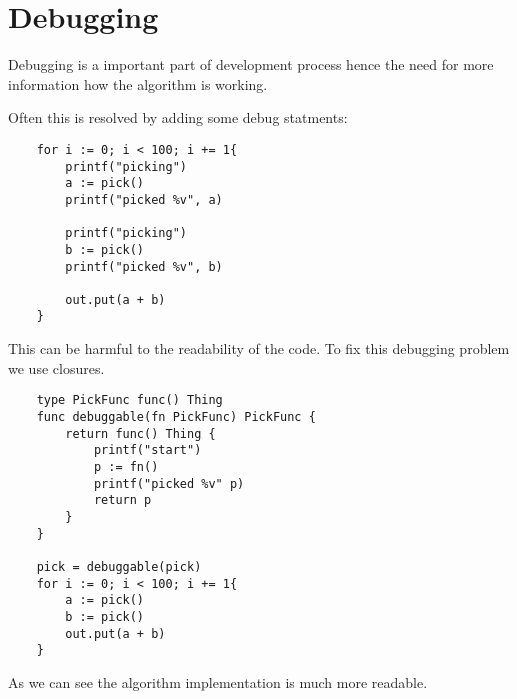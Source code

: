\section{Debugging}

Debugging is a important part of development process hence the need for
more information how the algorithm is working.

Often this is resolved by adding some debug statments:

\begin{verbatim}
	for i := 0; i < 100; i += 1{
		printf("picking")
		a := pick()
		printf("picked %v", a)

		printf("picking")
		b := pick()
		printf("picked %v", b)
		
		out.put(a + b)
	}
\end{verbatim}

This can be harmful to the readability of the code. To fix this debugging 
problem we use closures.

\begin{verbatim}
	type PickFunc func() Thing
	func debuggable(fn PickFunc) PickFunc {
		return func() Thing {
			printf("start")
			p := fn()
			printf("picked %v" p)
			return p
		}
	}

	pick = debuggable(pick)
	for i := 0; i < 100; i += 1{
		a := pick()
		b := pick()
		out.put(a + b)
	}
\end{verbatim}

As we can see the algorithm implementation is much more readable.

